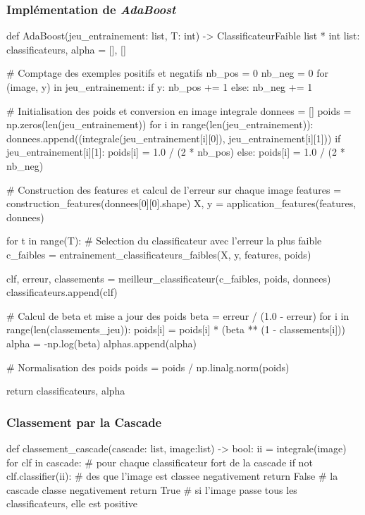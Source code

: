 \documentclass[12pt,a4paper]{article}
\begin{document}
\subsubsection{Implémentation de \textit{AdaBoost}} \label{sec:impl-adaboost}
\begin{python}
def AdaBoost(jeu_entrainement: list, T: int) -> ClassificateurFaible list * int list:    
    classificateurs, alpha = [], []

    # Comptage des exemples positifs et negatifs
    nb_pos = 0
    nb_neg = 0
    for (image, y) in jeu_entrainement:
        if y:
            nb_pos += 1
        else:
            nb_neg += 1
    
    # Initialisation des poids et conversion en image integrale
    donnees = []
    poids = np.zeros(len(jeu_entrainement))
    for i in range(len(jeu_entrainement)):
        donnees.append((integrale(jeu_entrainement[i][0]), jeu_entrainement[i][1]))
        if jeu_entrainement[i][1]:
            poids[i] = 1.0 / (2 * nb_pos)
        else:
            poids[i] = 1.0 / (2 * nb_neg)

    # Construction des features et calcul de l'erreur sur chaque image
    features = construction_features(donnees[0][0].shape)
    X, y = application_features(features, donnees)

    for t in range(T):
        # Selection du classificateur avec l'erreur la plus faible
        c_faibles = entrainement_classificateurs_faibles(X, y, features, poids)

        clf, erreur, classements = meilleur_classificateur(c_faibles, poids, donnees)
        classificateurs.append(clf)

        # Calcul de beta et mise a jour des poids
        beta = erreur / (1.0 - erreur)
        for i in range(len(classements_jeu)):
            poids[i] = poids[i] * (beta ** (1 - classements[i]))
        alpha = -np.log(beta)
        alphas.append(alpha)

        # Normalisation des poids
        poids = poids / np.linalg.norm(poids)

    return classificateurs, alpha
\end{python}

\newpage

\subsubsection{Classement par la Cascade} \label{sec:code-cascade}
\begin{python}
def classement_cascade(cascade: list, image:list) -> bool:
    ii = integrale(image)
    for clf in cascade: # pour chaque classificateur fort de la cascade
        if not clf.classifier(ii): # des que l'image est classee negativement
            return False # la cascade classe negativement
    return True # si l'image passe tous les classificateurs, elle est positive
\end{python}
\end{document}
